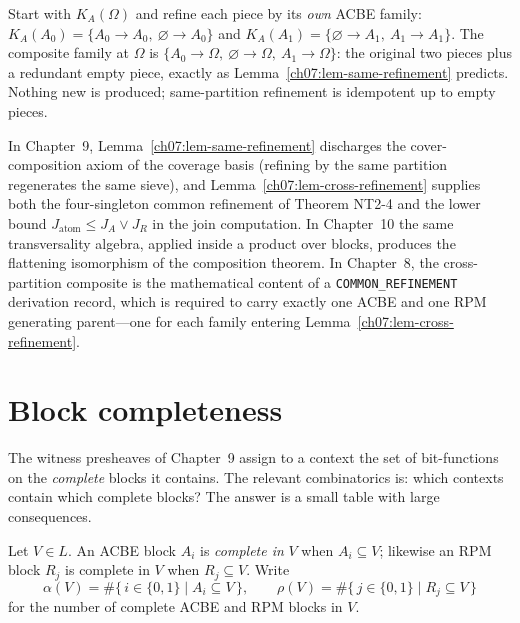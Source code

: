 \begin{example}\label{ch07:ex-composite-same}
Start with $K_{A}(\Omega)$ and refine each piece by its \emph{own} ACBE family: $K_{A}(A_{0})=\{A_{0}\to A_{0},\ \varnothing\to A_{0}\}$ and $K_{A}(A_{1})=\{\varnothing\to A_{1},\ A_{1}\to A_{1}\}$. The composite family at $\Omega$ is $\{A_{0}\to\Omega,\ \varnothing\to\Omega,\ A_{1}\to\Omega\}$: the original two pieces plus a redundant empty piece, exactly as Lemma~\ref{ch07:lem-same-refinement} predicts. Nothing new is produced; same-partition refinement is idempotent up to empty pieces.
\end{example}

\begin{remark}\label{ch07:rem-composition-forward}
In Chapter~9, Lemma~\ref{ch07:lem-same-refinement} discharges the cover-composition axiom of the coverage basis (refining by the same partition regenerates the same sieve), and Lemma~\ref{ch07:lem-cross-refinement} supplies both the four-singleton common refinement of Theorem NT2-4 and the lower bound $J_{\mathrm{atom}}\le J_{A}\vee J_{R}$ in the join computation. In Chapter~10 the same transversality algebra, applied inside a product over blocks, produces the flattening isomorphism of the composition theorem. In Chapter~8, the cross-partition composite is the mathematical content of a \texttt{COMMON\_REFINEMENT} derivation record, which is required to carry exactly one ACBE and one RPM generating parent---one for each family entering Lemma~\ref{ch07:lem-cross-refinement}.
\end{remark}

\section{Block completeness}\label{ch07:sec-blocks}

The witness presheaves of Chapter~9 assign to a context the set of bit-functions on the \emph{complete} blocks it contains. The relevant combinatorics is: which contexts contain which complete blocks? The answer is a small table with large consequences.

\begin{definition}\label{ch07:def-complete}
Let $V\in L$. An ACBE block $A_{i}$ is \emph{complete in} $V$ when $A_{i}\subseteq V$; likewise an RPM block $R_{j}$ is complete in $V$ when $R_{j}\subseteq V$. Write
\[
\alpha(V)=\#\{\,i\in\{0,1\} \mid A_{i}\subseteq V\,\},
\qquad
\rho(V)=\#\{\,j\in\{0,1\} \mid R_{j}\subseteq V\,\}
\]
for the number of complete ACBE and RPM blocks in $V$.
\end{definition}

